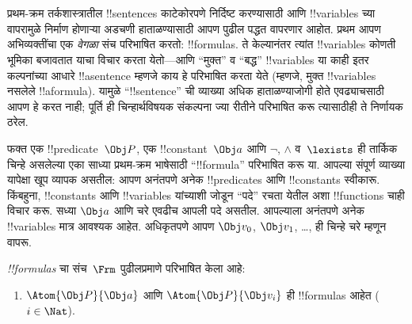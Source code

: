 \documentclass[../../../include/open-logic-section]{subfiles}
\begin{document}

\section{}

प्रथम-क्रम तर्कशास्त्रातील !!{sentence}s काटेकोरपणे निर्दिष्ट करण्यासाठी
आणि !!{variable}s च्या वापरामुळे निर्माण होणाऱ्या अडचणी हाताळण्यासाठी
आपण पुढील पद्धत वापरणार आहोत. प्रथम आपण अभिव्यक्तींचा एक
\emph{वेगळा} संच परिभाषित करतो: !!{formula}s. ते केल्यानंतर त्यांत
!!{variable}s कोणती भूमिका बजावतात याचा विचार करता येतो---आणि
``मुक्त'' व ``बद्ध'' !!{variable}s या काही इतर कल्पनांच्या आधारे
!!a{sentence} म्हणजे काय हे परिभाषित करता येते (म्हणजे, मुक्त
!!{variable}s नसलेले !!a{formula}). यामुळे ``!!{sentence}'' ची व्याख्या
अधिक हाताळण्याजोगी होते एवढ्याचसाठी आपण हे करत नाही; पूर्ति ही
चिन्हार्थविषयक संकल्पना ज्या रीतीने परिभाषित करू त्यासाठीही ते
निर्णायक ठरेल.

फक्त एक !!{predicate}~$\Obj P$, एक !!{constant}~$\Obj a$ आणि
$\lnot$, $\land$ व~$\lexists$ ही तार्किक चिन्हे असलेल्या एका साध्या
प्रथम-क्रम भाषेसाठी ``!!{formula}'' परिभाषित करू या. आपल्या संपूर्ण
व्याख्या यापेक्षा खूप व्यापक असतील: आपण अनंतपणे अनेक !!{predicate}s
आणि !!{constant}s स्वीकारू. किंबहुना, !!{constant}s आणि !!{variable}s
यांच्याशी जोडून ``पदे'' रचता येतील अशा !!{function}s चाही विचार करू.
सध्या $\Obj a$ आणि चरे एवढीच आपली पदे असतील. आपल्याला अनंतपणे अनेक
!!{variable}s मात्र आवश्यक आहेत. अधिकृतपणे आपण $\Obj v_0$, $\Obj
v_1$, \dots, ही चिन्हे चरे म्हणून वापरू.

\begin{defn}
\emph{!!{formula}s} चा संच~$\Frm$ पुढीलप्रमाणे परिभाषित केला आहे:
\begin{enumerate}
\item{} $\Atom{\Obj P}{\Obj a}$ आणि $\Atom{\Obj
  P}{\Obj v_i}$ ही !!{formula}s आहेत ($i \in \Nat$).




\end{enumerate}
\end{defn}
\end{document}
